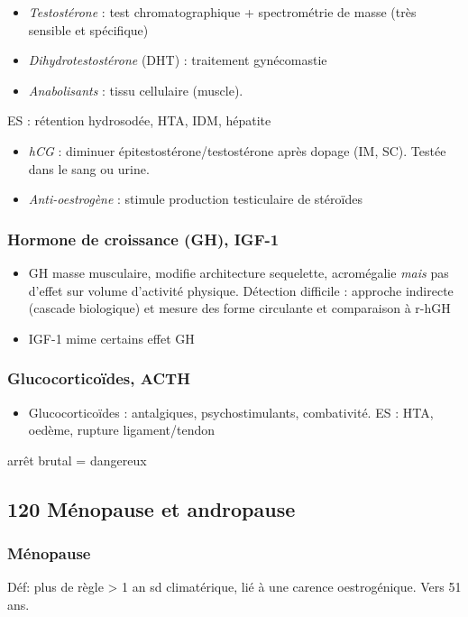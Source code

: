 \documentclass[11pt]{article}
\begin{document}
\vspace*{0.5cm}
\begin{itemize}
\item \emph{Testostérone} : test chromatographique + spectrométrie de masse (très sensible
et spécifique)
\item \emph{Dihydrotestostérone} (DHT) : traitement gynécomastie
\item \emph{Anabolisants} : \inc tissu cellulaire (muscle).
\end{itemize}
ES : rétention hydrosodée, HTA, IDM, hépatite
\begin{itemize}
\item \emph{hCG} : diminuer épitestostérone/testostérone après dopage (IM, SC). Testée dans
le sang ou urine.
\item \emph{Anti-oestrogène} : stimule production testiculaire de stéroïdes
\end{itemize}

\subsubsection{Hormone de croissance (GH), IGF-1}
\label{sec:org0581239}
\begin{itemize}
\item GH \inc masse musculaire, modifie architecture sequelette, acromégalie \emph{mais}
pas d'effet sur volume d'activité physique. Détection difficile : approche
indirecte (cascade biologique) et mesure des forme circulante et comparaison à r-hGH
\item IGF-1 mime certains effet GH
\end{itemize}

\subsubsection{Glucocorticoïdes, ACTH}
\label{sec:orgd9172f8}
\begin{itemize}
\item Glucocorticoïdes : antalgiques, psychostimulants, combativité. ES : HTA,
oedème, rupture ligament/tendon
\end{itemize}
\danger arrêt brutal = dangereux 

\subsection{120 \textdagger{} Ménopause et andropause}
\label{sec:org19ac9c3}
\label{sec:120}
\subsubsection{Ménopause}
\label{sec:org60252ed}
Déf: plus de règle > 1 an \textpm{} sd climatérique, lié à une carence
oestrogénique. Vers 51 ans.
\end{document}
